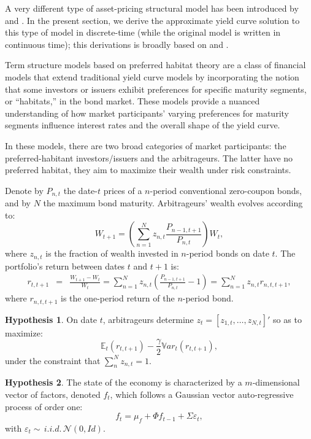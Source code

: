 \documentclass[
  12pt,
]{book}
\theoremstyle{definition}
\theoremstyle{definition}
\theoremstyle{definition}
\theoremstyle{definition}
\newtheorem{hypothesis}{Hypothesis}[chapter]
\theoremstyle{remark}
\begin{document}
A very different type of asset-pricing structural model has been introduced by \citet{Greenwood_Vayanos_2014} and \citet{Vayanos_Vila_2021}. In the present section, we derive the approximate yield curve solution to this type of model in discrete-time (while the original model is written in continuous time); this derivations is broadly based on \citet{Hamilton_Wu_2012} and \citet{Hayashi_2018}.

Term structure models based on preferred habitat theory are a class of financial models that extend traditional yield curve models by incorporating the notion that some investors or issuers exhibit preferences for specific maturity segments, or ``habitats,'' in the bond market. These models provide a nuanced understanding of how market participants' varying preferences for maturity segments influence interest rates and the overall shape of the yield curve.

In these models, there are two broad categories of market participants: the preferred-habitant investors/issuers and the arbitrageurs. The latter have no preferred habitat, they aim to maximize their wealth under risk constraints.

Denote by \(P_{n,t}\) the date-\(t\) prices of a \(n\)-period conventional zero-coupon bonds, and by \(N\) the maximum bond maturity. Arbitrageurs' wealth evolves according to:
\[
W_{t+1} = \left(\sum_{n=1}^N z_{n,t}\frac{P_{n-1,t+1}}{P_{n,t}}\right)W_t,
\]
where \(z_{n,t}\) is the fraction of wealth invested in \(n\)-period bonds on date \(t\). The portfolio's return between dates \(t\) and \(t+1\) is:
\begin{eqnarray*}
r_{t,t+1} &=& \frac{W_{t+1}-W_t}{W_t}=
\sum_{n=1}^N z_{n,t}\left(\frac{P_{n-1,t+1}}{P_{n,t}}-1\right) = \sum_{n=1}^N z_{n,t}r_{n,t,t+1},
\end{eqnarray*}
where \(r_{n,t,t+1}\) is the one-period return of the \(n\)-period bond.

\begin{hypothesis}
\protect\hypertarget{hyp:prefArbit}{}\label{hyp:prefArbit}On date \(t\), arbitrageurs determine \(z_t=[z_{1,t},\dots,z_{N,t}]'\) so as to maximize:
\[
\mathbb{E}_t(r_{t,t+1}) - \frac{\gamma}{2}\mathbb{V}ar_t(r_{t,t+1}),
\]
under the constraint that \(\sum_n^N z_{n,t} = 1\).
\end{hypothesis}

\begin{hypothesis}
\protect\hypertarget{hyp:dynF}{}\label{hyp:dynF}The state of the economy is characterized by a \(m\)-dimensional vector of factors, denoted \(f_t\), which follows a Gaussian vector auto-regressive process of order one:
\[
f_t = \mu_f + \Phi f_{t-1} + \Sigma \varepsilon_t,
\]
with \(\varepsilon_t \sim\,i.i.d.\,\mathcal{N}(0,Id)\).
\end{hypothesis}
\end{document}
